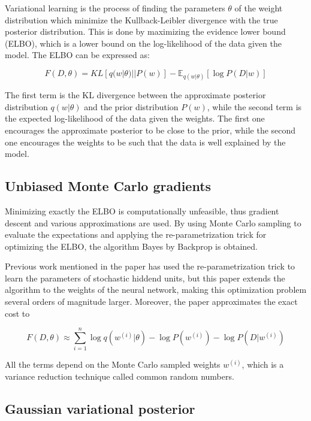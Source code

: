 \documentclass{article}
\begin{document}
Variational learning is the process of finding the parameters $\theta$ of the weight distribution which minimize the Kullback-Leibler divergence with the true posterior distribution. This is done by maximizing the evidence lower bound (ELBO), which is a lower bound on the log-likelihood of the data given the model. The ELBO can be expressed as:

\[
    F(D, \theta) = KL[q(w | \theta) || P(w)] - \mathbb{E}_{q(w | \theta)}[\log P(D | w)]
\]

The first term is the KL divergence between the approximate posterior distribution $q(w | \theta)$ and the prior distribution $P(w)$, while the second term is the expected log-likelihood of the data given the weights. The first one encourages the approximate posterior to be close to the prior, while the second one encourages the weights to be such that the data is well explained by the model.

\subsection{Unbiased Monte Carlo gradients}

Minimizing exactly the ELBO is computationally unfeasible, thus gradient descent and various approximations are used. By using Monte Carlo sampling to evaluate the expectations and applying the re-parametrization trick for optimizing the ELBO, the algorithm Bayes by Backprop is obtained.

Previous work mentioned in the paper has used the re-parametrization trick to learn the parameters of stochastic hiddend units, but this paper extends the algorithm to the weights of the neural network, making this optimization problem several orders of magnitude larger. Moreover, the paper approximates the exact cost to

\[
    F(D, \theta) \approx \sum_{i=1}^{n} \log q(w^{(i)} | \theta) - \log P(w^{(i)}) - \log P(D | w^{(i)})
\]

All the terms depend on the Monte Carlo sampled weights $w^{(i)}$, which is a variance reduction technique called common random numbers.

\subsection{Gaussian variational posterior}
\end{document}
